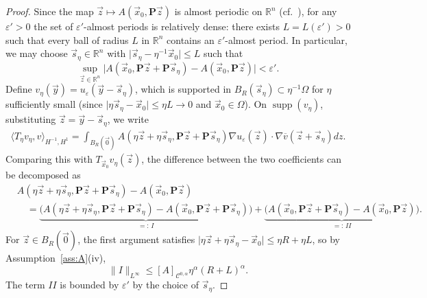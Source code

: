 \documentclass[a4paper,reqno]{amsart}
\numberwithin{equation}{section}
\numberwithin{equation}{section}		%
\numberwithin{figure}{section}			%
\numberwithin{table}{section}				%
\newcommand{\R}{\mathbb{R}}
\theoremstyle{definition}
\newcommand{\<}{\ensuremath \leq}
\renewcommand{\>}{\ensuremath \geq}
\renewcommand{\epsilon}{\varepsilon}
\begin{document}
\begin{proof}
Since the map $\vec{z}\mapsto A(\vec{x}_0, \textbf{P}\vec{z})$ is almost periodic on $\R^n$ (cf.\ \cite{shubin1978almost}), for any $\epsilon'>0$ the set of $\epsilon'$-almost periods is relatively dense: there exists $L=L(\epsilon')>0$ such that every ball of radius $L$ in $\R^n$ contains an $\epsilon'$-almost period. In particular, we may choose $\vec{s}_\eta\in\R^n$ with $\lvert\vec{s}_\eta - \eta^{-1}\vec{x}_0\rvert \leq L$ such that
\begin{equation}
    \sup_{\vec{z}\in\R^n}\lvert A(\vec{x}_0, \textbf{P}\vec{z} + \textbf{P}\vec{s}_\eta) - A(\vec{x}_0, \textbf{P}\vec{z})\rvert < \epsilon'.
\end{equation}
Define $v_\eta(\vec{y}) = u_\epsilon(\vec{y} - \vec{s}_\eta)$, which is supported in $B_R(\vec{s}_\eta)\subset\eta^{-1}\Omega$ for $\eta$ sufficiently small (since $\lvert\eta\vec{s}_\eta - \vec{x}_0\rvert \leq \eta L\to 0$ and $\vec{x}_0\in\Omega$).
On $\operatorname{supp}(v_\eta)$, substituting $\vec{z}=\vec{y}-\vec{s}_\eta$, we write
    \begin{equation}
       \begin{aligned}
            \langle T_{\eta}v_\eta,v \rangle_{H^{-1},H^{1}}=\int_{B_R(\vec{0})}A\left( \eta\vec{z} + \eta\vec{s}_\eta, \textbf{P}\vec{z} + \textbf{P}\vec{s}_\eta\right)\nabla u_\varepsilon(\vec{z}) \cdot \nabla \overline{v}(\vec{z} + \vec{s}_\eta) dz .
       \end{aligned}
    \end{equation}
    Comparing this with $T_{\vec{x}_0}v_\eta(\vec{z}) $, the difference between the two coefficients can be decomposed as
    \begin{equation}
        \begin{aligned}
            &A(\eta\vec{z}+\eta\vec{s}_\eta, \textbf{P}\vec{z}+\textbf{P}\vec{s}_\eta) - A(\vec{x}_0, \textbf{P}\vec{z})\\
            &\quad= \underbrace{\bigl(A(\eta\vec{z}+\eta\vec{s}_\eta, \textbf{P}\vec{z}+\textbf{P}\vec{s}_\eta) - A(\vec{x}_0, \textbf{P}\vec{z}+\textbf{P}\vec{s}_\eta)\bigr)}_{=:\,I} + \underbrace{\bigl(A(\vec{x}_0, \textbf{P}\vec{z}+\textbf{P}\vec{s}_\eta) - A(\vec{x}_0, \textbf{P}\vec{z})\bigr)}_{=:\,II}.
        \end{aligned}
    \end{equation}
    For $\vec{z}\in B_R(\vec{0})$, the first argument satisfies $\lvert \eta\vec{z}+\eta\vec{s}_\eta - \vec{x}_0\rvert \leq \eta R + \eta L$, so by Assumption~\ref{ass:A}(iv),
    \begin{equation}
        \lVert I\rVert_{L^\infty} \leq[A]_{\mathcal{C}^{0,\alpha}}\eta^\alpha(R+L)^\alpha.
    \end{equation}
    The term $II$ is bounded by $\epsilon'$ by the choice of $\vec{s}_\eta$.


\end{proof}
\end{document}
